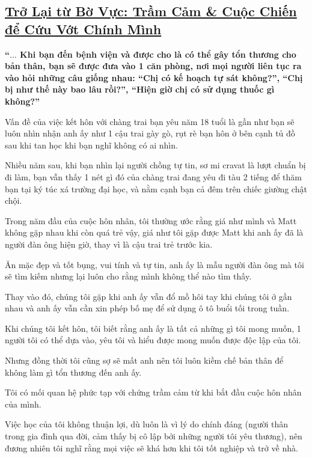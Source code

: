 \documentclass{article}
\begin{document}

\subsection{\href{http://tramdoc.vn/tin-tuc/tro-lai-tu-bo-vuc-tram-cam-va-cuoc-chien-de-cuu-vot-chinh-minh-nYDm9W.html}{Trở Lại từ Bờ Vực: Trầm Cảm \& Cuộc Chiến để Cứu Vớt Chính Mình}}

\textbf{``$\ldots$ Khi bạn đến bệnh viện và được cho là có thể gây tổn thương cho bản thân, bạn sẽ được đưa vào 1 căn phòng, nơi mọi người liên tục ra vào hỏi những câu giống nhau: ``Chị có kế hoạch tự sát không?'', ``Chị bị như thế này bao lâu rồi?'', ``Hiện giờ chị có sử dụng thuốc gì không?''}

%
Vấn đề của việc kết hôn với chàng trai bạn yêu năm 18 tuổi là gần như bạn sẽ luôn nhìn nhận anh ấy như 1 cậu trai gày gò, rụt rè bạn hôn ở bên cạnh tủ đồ sau khi tan học khi bạn nghĩ không có ai nhìn.

Nhiều năm sau, khi bạn nhìn lại người chồng tự tin, sơ mi cravat là lượt chuẩn bị đi làm, bạn vẫn thấy 1 nét gì đó của chàng trai đang yêu đi tàu 2 tiếng để thăm bạn tại ký túc xá trường đại học, và nằm cạnh bạn cả đêm trên chiếc giường chật chội.

%
Trong năm đầu của cuộc hôn nhân, tôi thường ước rằng giá như mình và Matt không gặp nhau khi còn quá trẻ vậy, giá như tôi gặp được Matt khi anh ấy đã là người đàn ông hiện giờ, thay vì là cậu trai trẻ trước kia.

Ăn mặc đẹp và tốt bụng, vui tính và tự tin, anh ấy là mẫu người đàn ông mà tôi sẽ tìm kiếm nhưng lại luôn cho rằng mình không thể nào tìm thấy.

%
Thay vào đó, chúng tôi gặp khi anh ấy vẫn đổ mồ hôi tay khi chúng tôi ở gần nhau và anh ấy vẫn cần xin phép bố mẹ để sử dụng ô tô buổi tối trong tuần.

Khi chúng tôi kết hôn, tôi biết rằng anh ấy là tất cả những gì tôi mong muốn, 1 người tôi có thể dựa vào, yêu tôi và hiểu được mong muốn được độc lập của tôi.

Nhưng đồng thời tôi cũng sợ sẽ mất anh nên tôi luôn kiềm chế bản thân để không làm gì tổn thương đến anh ấy.

%
Tôi có mối quan hệ phức tạp với chứng trầm cảm từ khi bắt đầu cuộc hôn nhân của mình.

Việc học của tôi không thuận lợi, dù luôn là vì lý do chính đáng (người thân trong gia đình qua đời, cảm thấy bị cô lập bởi những người tôi yêu thương), nên đương nhiên tôi nghĩ rằng mọi việc sẽ khá hơn khi tôi tốt nghiệp và trở về nhà.
\end{document}
